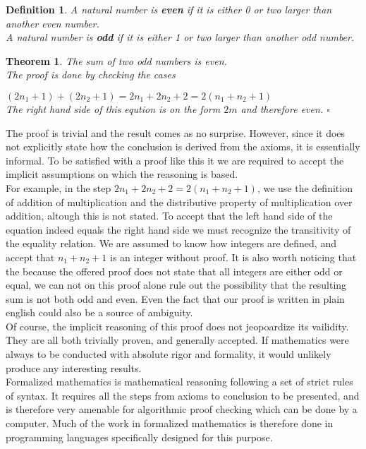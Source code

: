 \documentclass[11pt,a4paper]{article}
\begin{document}
\newtheorem{odd and even}{Definition}
\begin{odd and even}
A natural number is \textbf{even} if it is either 0 or two larger than another even number.\\
A natural number is \textbf{odd} if it is either 1 or two larger than another odd number.
\end{odd and even}
\newtheorem{informal}{Theorem}
\begin{informal}
The sum of two odd numbers is even.\\
The proof is done by checking the cases

$(2n_1+1) + (2n_2+1) = 2n_1 + 2n_2 + 2 = 2(n_1 + n_2 + 1)$\\
The right hand side of this eqution is on the form $2m$ and therefore even. $\square$\\
\end{informal}

The proof is trivial and the result comes as no surprise. However, since it does not explicitly state how the conclusion is derived from the axioms, it is essentially informal. To be satisfied with a proof like this it we are required to accept the implicit assumptions on which the reasoning is based.\\
For example, in the step $2n_1+2n_2+2 = 2(n_1+n_2+1)$, we use the definition of addition of multiplication and the distributive property of multiplication over addition, altough this is not stated. To accept that the left hand side of the equation indeed equals the right hand side we must recognize the transitivity of the equality relation. We are assumed to know how integers are defined, and accept that $n_1+n_2+1$ is an integer without proof. It is also worth noticing that the because the offered proof does not state that all integers are either odd or equal, we can not on this proof alone rule out the possibility that the resulting sum is not both odd and even. Even the fact that our proof is written in plain english could also be a source of ambiguity.\\

Of course, the implicit reasoning of this proof does not jeopoardize its vailidity. They are all both trivially proven, and generally accepted. If mathematics were always to be conducted with absolute rigor and formality, it would unlikely produce any interesting results.\\

Formalized mathematics is mathematical reasoning following a set of strict rules of syntax. It requires all the steps from axioms to conclusion to be presented, and is therefore very amenable for algorithmic proof checking which can be done by a computer. Much of the work in formalized mathematics is therefore done in programming languages specifically designed for this purpose.\\
\end{document}
